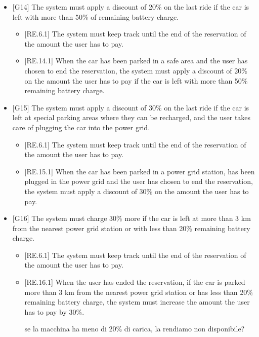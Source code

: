 \documentclass[english]{article}
\begin{document}
\begin{itemize}
\item{[G14] The system must apply a discount of 20\% on the last ride if the car is left with more than 50\% of remaining battery charge.
\begin{itemize}
	\item{[RE.6.1] The system must keep track until the end of the reservation of the amount the user has to pay.}
	\item{[RE.14.1] When the car has been parked in a safe area and the user has chosen to end the reservation, the system must apply a discount of 20\% on the amount the user has to pay if the car is left with more than 50\% remaining battery charge.}
\end{itemize}
}

\item{[G15] The system must apply a discount of 30\% on the last ride if the car is left at special parking areas where they can be recharged, and the user takes care of plugging the car into the power grid.
\begin{itemize}
	\item{[RE.6.1] The system must keep track until the end of the reservation of the amount the user has to pay.}
	\item{[RE.15.1] When the car has been parked in a power grid station, has been plugged in the power grid and the user has chosen to end the reservation, the system must apply a discount of 30\% on the amount the user has to pay.}
\end{itemize}
}

\item{[G16] The system must charge 30\% more if the car is left at more than 3 km from the nearest power grid station or with less than 20\% remaining battery charge.
\begin{itemize}
	\item{[RE.6.1] The system must keep track until the end of the reservation of the amount the user has to pay.}
	\item{[RE.16.1] When the user has ended the reservation, if the car is parked more than 3 km from the nearest power grid station or has less than 20\% remaining battery charge, the system must increase the amount the user has to pay by 30\%.}
	
se la macchina ha meno di 20\% di carica, la rendiamo non disponibile?
\end{itemize}
}

\end{itemize}
\end{document}
